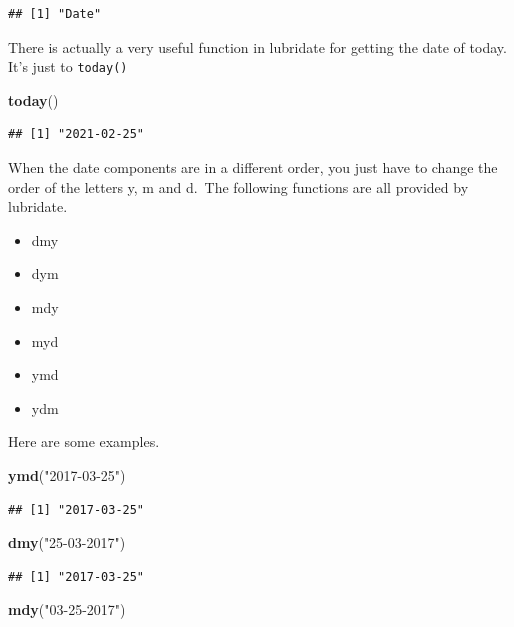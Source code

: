 \documentclass[]{tufte-book}
\newenvironment{Shaded}{}{}
\newcommand{\KeywordTok}[1]{\textcolor[rgb]{0.00,0.44,0.13}{\textbf{#1}}}
\newcommand{\NormalTok}[1]{#1}
\newcommand{\StringTok}[1]{\textcolor[rgb]{0.25,0.44,0.63}{#1}}
\providecommand{\tightlist}{%
  \setlength{\itemsep}{0pt}\setlength{\parskip}{0pt}}
\begin{document}
\begin{verbatim}
## [1] "Date"
\end{verbatim}

There is actually a very useful function in lubridate for getting the date of today. It's just to \texttt{today()}

\begin{Shaded}
\begin{Highlighting}[]
\KeywordTok{today}\NormalTok{()}
\end{Highlighting}
\end{Shaded}

\begin{verbatim}
## [1] "2021-02-25"
\end{verbatim}

When the date components are in a different order, you just have to change the order of the letters y, m and d.~The following functions are all provided by lubridate.

\begin{itemize}
\tightlist
\item
  dmy
\item
  dym
\item
  mdy
\item
  myd
\item
  ymd
\item
  ydm
\end{itemize}

Here are some examples.

\begin{Shaded}
\begin{Highlighting}[]
\KeywordTok{ymd}\NormalTok{(}\StringTok{"2017-03-25"}\NormalTok{)}
\end{Highlighting}
\end{Shaded}

\begin{verbatim}
## [1] "2017-03-25"
\end{verbatim}

\begin{Shaded}
\begin{Highlighting}[]
\KeywordTok{dmy}\NormalTok{(}\StringTok{"25-03-2017"}\NormalTok{)}
\end{Highlighting}
\end{Shaded}

\begin{verbatim}
## [1] "2017-03-25"
\end{verbatim}

\begin{Shaded}
\begin{Highlighting}[]
\KeywordTok{mdy}\NormalTok{(}\StringTok{"03-25-2017"}\NormalTok{)}
\end{Highlighting}
\end{Shaded}
\end{document}
